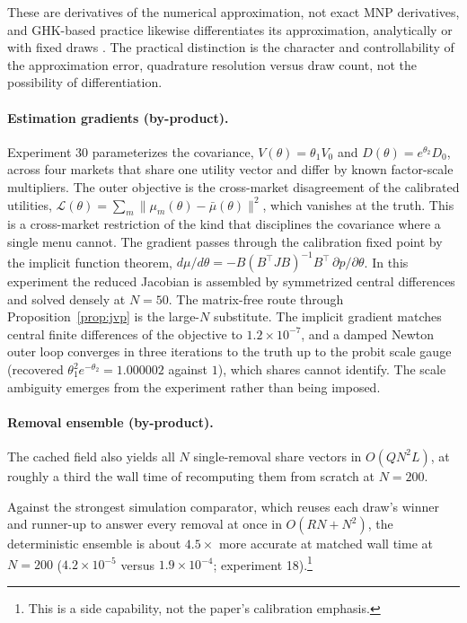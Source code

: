 \documentclass[12pt]{article}
\theoremstyle{remark}
\begin{document}
These are derivatives of the numerical
approximation, not exact MNP derivatives, and GHK-based practice likewise
differentiates its approximation, analytically or with fixed draws
\citep{hmr1996,hajivassiliou1998,train2009}. The practical distinction is the character and controllability of the
approximation error, quadrature resolution versus draw count, not the
possibility of differentiation.

\paragraph{Estimation gradients (by-product).} Experiment 30
parameterizes the covariance, $V(\theta) = \theta_1 V_0$ and
$D(\theta) = e^{\theta_2} D_0$, across four markets that share one
utility vector and differ by known factor-scale multipliers. The outer
objective is the cross-market disagreement of the calibrated utilities,
$\mathcal{L}(\theta) = \sum_m \|\mu_m(\theta) - \bar\mu(\theta)\|^2$, which
vanishes at the truth. This is a cross-market restriction of the kind
that disciplines the covariance where a single menu cannot. The
gradient passes through the calibration fixed point by the implicit
function theorem, $d\mu/d\theta = -B(B^\top J B)^{-1}B^\top\,
\partial p/\partial\theta$. In this experiment the reduced Jacobian is
assembled by symmetrized central differences and solved densely at
$N = 50$. The matrix-free route through Proposition~\ref{prop:jvp} is
the large-$N$ substitute. The implicit gradient matches central finite
differences of the objective to $1.2\times10^{-7}$, and a damped Newton
outer loop converges in three iterations to the truth up to the probit
scale gauge (recovered $\theta_1^2 e^{-\theta_2} = 1.000002$ against
$1$), which shares cannot identify. The scale ambiguity emerges from
the experiment rather than being imposed.

\paragraph{Removal ensemble (by-product).} The cached field also yields
all $N$ single-removal share vectors in $O(QN^2L)$, at roughly a third
the wall time of recomputing them from scratch at $N=200$.

Against the strongest simulation comparator, which reuses each draw's
winner and runner-up to answer every removal at once in $O(RN + N^2)$, the
deterministic ensemble is about $4.5\times$ more accurate at matched wall
time at $N=200$ ($4.2\times10^{-5}$ versus $1.9\times10^{-4}$;
experiment 18).\footnote{This is a side capability, not the paper's calibration emphasis.}
\end{document}
